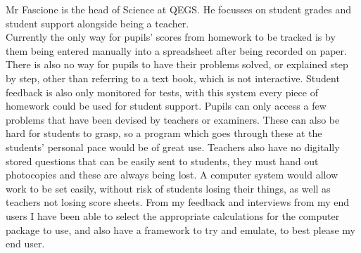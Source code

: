 \documentclass[a4paper,12pt]{report}
\begin{document}
Mr Fascione is the head of Science at QEGS.  He focusses on student grades and student support alongside being a teacher.\\
Currently the only way for pupils’ scores from homework to be tracked is by them being entered manually into a spreadsheet after being recorded on paper. There is also no way for pupils to have their problems solved, or explained step by step, other than referring to a text book, which is not interactive. Student feedback is also only monitored for tests, with this system every piece of homework could be used for student support.
Pupils can only access a few problems that have been devised by teachers or examiners. These can also be hard for students to grasp, so a program which goes through these at the students’ personal pace would be of great use. Teachers also have no digitally stored questions that can be easily sent to students, they must hand out photocopies and these are always being lost. A computer system would allow work to be set easily, without risk of students losing their things, as well as teachers not losing score sheets.
From my feedback and interviews from my end users I have been able to select the appropriate calculations for the computer package to use, and also have a framework to try and emulate, to best please my end user.\\
\end{document}
